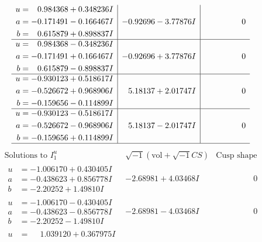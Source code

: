\documentclass[1p]{elsarticle_modified}
\theoremstyle{definition}
\newcommand{\I}{\sqrt{-1}}
\begin{document}
$$\begin{array}{c|c|c}
\begin{aligned}
u &= \phantom{-}0.984368 + 0.348236 I \\
a &= -0.171491 - 0.166467 I \\
b &= \phantom{-}0.615879 + 0.898837 I\end{aligned}
 & -0.92696 - 3.77876 I & \phantom{-0.000000 } 0 \\ \hline\begin{aligned}
u &= \phantom{-}0.984368 - 0.348236 I \\
a &= -0.171491 + 0.166467 I \\
b &= \phantom{-}0.615879 - 0.898837 I\end{aligned}
 & -0.92696 + 3.77876 I & \phantom{-0.000000 } 0 \\ \hline\begin{aligned}
u &= -0.930123 + 0.518617 I \\
a &= -0.526672 + 0.968906 I \\
b &= -0.159656 - 0.114899 I\end{aligned}
 & \phantom{-}5.18137 + 2.01747 I & \phantom{-0.000000 } 0 \\ \hline\begin{aligned}
u &= -0.930123 - 0.518617 I \\
a &= -0.526672 - 0.968906 I \\
b &= -0.159656 + 0.114899 I\end{aligned}
 & \phantom{-}5.18137 - 2.01747 I & \phantom{-0.000000 } 0\\
 \hline 
 \end{array}$$\newpage$$\begin{array}{c|c|c}  
\text{Solutions to }I^u_{1}& \I (\text{vol} + \sqrt{-1}CS) & \text{Cusp shape}\\
 \hline 
\begin{aligned}
u &= -1.006170 + 0.430405 I \\
a &= -0.438623 + 0.856778 I \\
b &= -2.20252 + 1.49810 I\end{aligned}
 & -2.68981 + 4.03468 I & \phantom{-0.000000 } 0 \\ \hline\begin{aligned}
u &= -1.006170 - 0.430405 I \\
a &= -0.438623 - 0.856778 I \\
b &= -2.20252 - 1.49810 I\end{aligned}
 & -2.68981 - 4.03468 I & \phantom{-0.000000 } 0 \\ \hline\begin{aligned}
u &= \phantom{-}1.039120 + 0.367975 I \\

\end{aligned}
\end{array}$$
\end{document}
